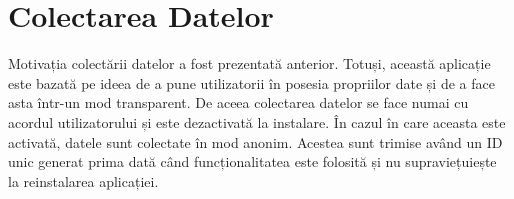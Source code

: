 \section{Colectarea Datelor}

Motivația colectării datelor a fost prezentată anterior. Totuși, această aplicație este bazată pe ideea de a pune utilizatorii în posesia propriilor date și de a face asta într-un mod transparent. De aceea colectarea datelor se face numai cu acordul utilizatorului și este dezactivată la instalare. În cazul în care aceasta este activată, datele sunt colectate în mod anonim. Acestea sunt trimise având un ID unic generat prima dată când funcționalitatea este folosită și nu supraviețuiește la reinstalarea aplicației.

